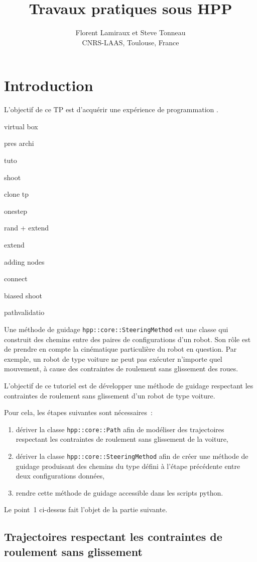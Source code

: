 \documentclass {article}
\author {Florent Lamiraux et Steve Tonneau\\
CNRS-LAAS, Toulouse, France}
\title {Travaux pratiques sous HPP}
\date {}
\begin{document}
\maketitle

\section {Introduction}
L'objectif de ce TP est d'acqu\'erir une exp\'erience
de programmation .


virtual box

pres archi

tuto

shoot

clone tp

onestep

rand + extend

extend

adding nodes

connect

biased shoot

pathvalidatio


Une méthode de guidage \texttt{hpp::core::SteeringMethod} est une
classe qui construit des chemins entre des paires de configurations
d'un robot. Son r\^ole est de prendre en compte la cinématique
particulière du robot en question. Par exemple, un robot de type
voiture ne peut pas exécuter n'importe quel mouvement, à cause des
contraintes de roulement sans glissement des roues.

L'objectif de ce tutoriel est de développer une méthode de guidage
respectant les contraintes de roulement sans glissement d'un robot de
type voiture.

Pour cela, les étapes suivantes sont nécessaires~:
\begin {enumerate}
\item dériver la classe \texttt{hpp::core::Path} afin de modéliser des trajectoires respectant les contraintes de roulement sans glissement de la voiture,
\item dériver la classe \texttt{hpp::core::SteeringMethod} afin de créer une méthode de guidage produisant des chemins du type défini à l'étape précédente entre deux configurations données,
\item rendre cette méthode de guidage accessible dans les scripts python.
\end {enumerate}
Le point~1 ci-dessus fait l'objet de la partie suivante.

\subsection {Trajectoires respectant les contraintes de roulement sans glissement}
\end{document}
